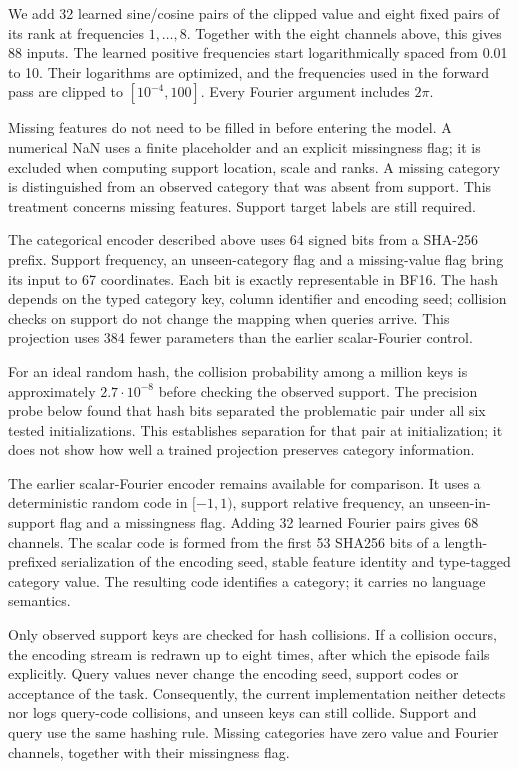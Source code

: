 \documentclass[11pt]{article}
\begin{document}
We add 32 learned sine/cosine pairs of the clipped value and eight fixed pairs of its rank at frequencies $1,\ldots,8$. Together with the eight channels above, this gives 88 inputs. The learned positive frequencies start logarithmically spaced from 0.01 to 10. Their logarithms are optimized, and the frequencies used in the forward pass are clipped to $[10^{-4},100]$. Every Fourier argument includes $2\pi$.

Missing features do not need to be filled in before entering the model. A numerical NaN uses a finite placeholder and an explicit missingness flag; it is excluded when computing support location, scale and ranks. A missing category is distinguished from an observed category that was absent from support. This treatment concerns missing features. Support target labels are still required.

The categorical encoder described above uses 64 signed bits from a SHA-256 prefix. Support frequency, an unseen-category flag and a missing-value flag bring its input to 67 coordinates. Each bit is exactly representable in BF16. The hash depends on the typed category key, column identifier and encoding seed; collision checks on support do not change the mapping when queries arrive. This projection uses 384 fewer parameters than the earlier scalar-Fourier control.

For an ideal random hash, the collision probability among a million keys is approximately $2.7\cdot10^{-8}$ before checking the observed support. The precision probe below found that hash bits separated the problematic pair under all six tested initializations. This establishes separation for that pair at initialization; it does not show how well a trained projection preserves category information.

The earlier scalar-Fourier encoder remains available for comparison. It uses a deterministic random code in $[-1,1)$, support relative frequency, an unseen-in-support flag and a missingness flag. Adding 32 learned Fourier pairs gives 68 channels. The scalar code is formed from the first 53 SHA256 bits of a length-prefixed serialization of the encoding seed, stable feature identity and type-tagged category value. The resulting code identifies a category; it carries no language semantics.

Only observed support keys are checked for hash collisions. If a collision occurs, the encoding stream is redrawn up to eight times, after which the episode fails explicitly. Query values never change the encoding seed, support codes or acceptance of the task. Consequently, the current implementation neither detects nor logs query-code collisions, and unseen keys can still collide. Support and query use the same hashing rule. Missing categories have zero value and Fourier channels, together with their missingness flag.
\end{document}
